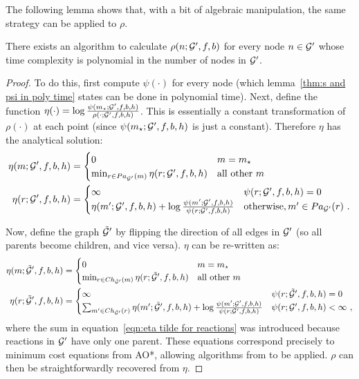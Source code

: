 The following lemma shows that,
with a bit of algebraic manipulation,
the same strategy can be applied to $\rho$.
\begin{lemma}
    There exists an algorithm to calculate
    $\rho(n;{\mathcal{G}}',f,b)$
    for every node $n\in{\mathcal{G}}'$ whose time
    complexity is polynomial in the number of nodes in ${\mathcal{G}}'$.
\end{lemma}
\begin{proof}
    To do this, first compute $\psi(\cdot)$
    for every node
    (which lemma~\ref{thm:s and psi in poly time} states can be done in polynomial time).
    Next, define the function
    $\eta(\cdot)=\log{\frac{\psi(\ensuremath{m_\star};{\mathcal{G}}',f,b,h)}{\rho(\cdot;{\mathcal{G}}',f,b,h)}}$.
    This is essentially a constant transformation of $\rho(\cdot)$
    at each point (since $\psi(m_\star;{\mathcal{G}}',f,b,h)$ is just a constant).
    Therefore $\eta$ has the analytical solution:
    \begin{align}
        \eta(m;{\mathcal{G}}',f,b,h) &= \begin{cases}
        0 & m=m_\star \\ 
        \min_{r\in Pa_{{\mathcal{G}}'}(m)}\eta(r;{\mathcal{G}}',f,b,h) & \text{all other }m \\
        \end{cases}  \\
        \eta(r;{\mathcal{G}}',f,b,h) &= \begin{cases}
            \infty & \psi(r;{\mathcal{G}}',f,b,h) = 0 \\
            \eta(m';{\mathcal{G}}',f,b,h) + \log{\frac{\psi(m';{\mathcal{G}}',f,b,h)}{\psi(r;{\mathcal{G}}',f,b,h)}} & \text{otherwise}, m'\in Pa_{{\mathcal{G}}'}(r)\ .
        \end{cases}
    \end{align}

    Now, define the graph $\tilde{{\mathcal{G}}}'$ by flipping the direction of all edges
    in ${\mathcal{G}}'$ (so all parents become children, and vice versa).
    $\eta$ can be re-written as:
    \begin{align}
        \eta(m;\tilde{{\mathcal{G}}}',f,b,h) &= \begin{cases}
        0 & m=m_\star \\ 
        \min_{r\in Ch_{\tilde{{\mathcal{G}}}'}(m)}\eta(r;\tilde{{\mathcal{G}}}',f,b,h) & \text{all other }m \\
        \end{cases}  \\
        \eta(r;\tilde{{\mathcal{G}}}',f,b,h) &= \begin{cases}
            \infty & \psi(r;\tilde{{\mathcal{G}}}',f,b,h) = 0 \\
            \sum_{m'\in Ch_{\tilde{{\mathcal{G}}}'}(r)}
                \eta(m';\tilde{{\mathcal{G}}}',f,b,h) + \log{\frac{\psi(m';{\mathcal{G}}',f,b,h)}{\psi(r;{\mathcal{G}}',f,b,h)}} & \psi(r;{\mathcal{G}}',f,b,h) < \infty \ , \label{eqn:eta tilde for reactions}
        \end{cases}
    \end{align}
    where the sum in equation~\ref{eqn:eta tilde for reactions} was introduced because reactions in ${\mathcal{G}}'$
    have only one parent.
    These equations correspond precisely to minimum cost equations from AO*,
    allowing algorithms from \citet{chakrabarti1994algorithms} to be applied.
    $\rho$ can then be straightforwardly recovered from $\eta$.
\end{proof}

